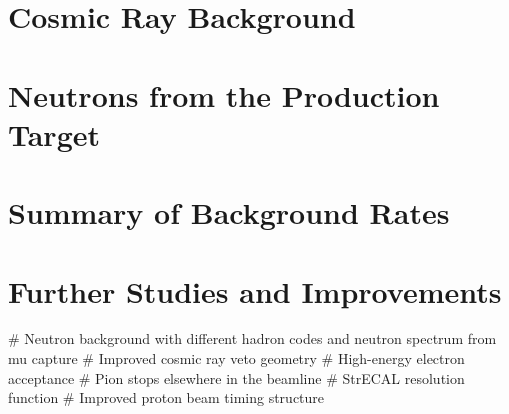 \section{Cosmic Ray Background}

\section{Neutrons from the Production Target}

\section{Summary of Background Rates}

\section{Further Studies and Improvements}
\begin{easylist}
# Neutron background with different hadron codes and \alcap neutron spectrum from mu capture
# Improved cosmic ray veto geometry
# High-energy electron acceptance
# Pion stops elsewhere in the beamline
# StrECAL resolution function
# Improved proton beam timing structure 
\end{easylist}
